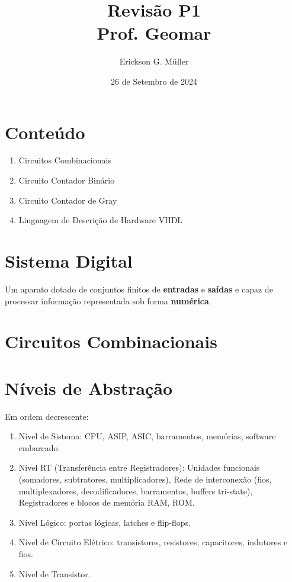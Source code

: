 \documentclass[•]{article}
\title{Revisão P1\\Prof. Geomar}
\date{26 de Setembro de 2024}
\author{Erickson G. Müller}
\begin{document}
	\maketitle
	\section*{Conteúdo}
		\begin{enumerate}
			\item Circuitos Combinacionais
			\item Circuito Contador Binário
			\item Circuito Contador de Gray
			\item Linguagem de Descrição de Hardware VHDL
		\end{enumerate}
	\newpage
	
	\section{Sistema Digital}
		Um aparato dotado de conjuntos finitos de \textbf{entradas} e \textbf{saídas} e capaz de processar informação representada sob forma \textbf{numérica}.
	\section{Circuitos Combinacionais}
	\section{Níveis de Abstração}
		Em ordem decrescente:
		\begin{enumerate}
			\item Nível de Sistema: CPU, ASIP, ASIC, barramentos, memórias, software embarcado.
			\item Nível RT (Transferência entre Registradores): Unidades funcionais (somadores, subtratores, multiplicadores), Rede de interconexão (fios, multiplexadores, decodificadores, barramentos, buffers tri-state), Registradores e blocos de memória RAM, ROM.
			\item Nível Lógico: portas lógicas, latches e flip-flops.
			\item Nível de Circuito Elétrico: transistores, resistores, capacitores, indutores e fios.
			\item Nível de Transistor.
		\end{enumerate}
\end{document}
